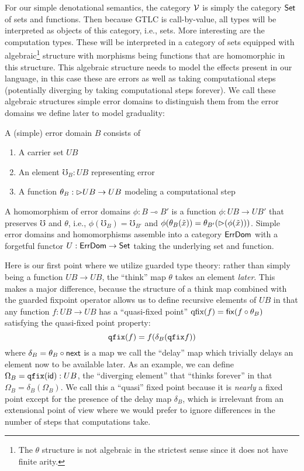 For our simple denotational semantics, the category $\mathcal{V}$ is simply
the category $\mathsf{Set}$ of sets and functions. Then because GTLC is
call-by-value, all types will be interpreted as objects of this
category, i.e., sets. More interesting are the computation
types. These will be interpreted in a category of sets equipped with
algebraic\footnote{The $\theta$ structure is not algebraic in the
strictest sense since it does not have finite arity.} structure with
morphisms being functions that are homomorphic in this structure.
This algebraic structure needs to model the effects present in our
language, in this case these are errors as well as taking
computational steps (potentially diverging by taking computational
steps forever).
%
We call these algebraic structures simple error domains to distinguish
them from the error domains we define later to model graduality:
\begin{definition}
  A (simple) error domain $B$ consists of
  \begin{enumerate}
  \item A carrier set $UB$
  \item An element $\mho_{B} : UB$ representing error
  \item A function $\theta_B : {{\vartriangleright}} UB \to UB$ modeling a computational step
  \end{enumerate}
  A homomorphism of error domains $\phi : B \multimap B'$ is a
  function $\phi : UB \to UB'$ that preserves $\mho$ and $\theta$, i.e.,
  $\phi(\mho_B) = \mho_{B'}$ and $\phi(\theta_{B}(\tilde{x})) =
  \theta_{B'}({\vartriangleright} (\phi(\tilde{x})))$.  Simple error domains and
  homomorphisms assemble into a category $\mathsf{ErrDom}$ with a forgetful
  functor $U : \mathsf{ErrDom} \to \mathsf{Set}$ taking the underlying set and
  function.
\end{definition}
Here is our first point where we utilize guarded type theory: rather
than simply being a function $UB \to UB$, the ``think'' map $\theta$
takes an element \emph{later}. This makes a major difference, because
the structure of a think map combined with the guarded fixpoint
operator allows us to define recursive elements of $UB$ in that any
function $f : UB \to UB$ has a ``quasi-fixed point'' $\textrm{qfix}(f)
= \mathsf{fix}(f \circ \theta_B)$ satisfying the quasi-fixed point property:
\[ \texttt{qfix}(f) = f(\delta_B(\texttt{qfix} f)) \]
where $\delta_B = \theta_B \circ \mathsf{next}$ is a map we call the ``delay''
map which trivially delays an element now to be available later.  As
an example, we can define $\Omega_B = \texttt{qfix}(\mathsf{id}) : UB$, the
``diverging element'' that ``thinks forever'' in that $\Omega_B =
\delta_B(\Omega_B)$. We call this a ``quasi'' fixed point because it is
\emph{nearly} a fixed point except for the presence of the delay map
$\delta_B$, which is irrelevant from an extensional point of view
where we would prefer to ignore differences in the number of steps
that computations take.

